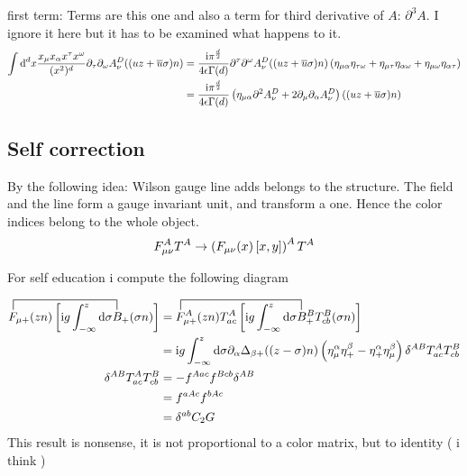first term: Terms are this one and also a term for third derivative of $A$: $\partial^3A$. I ignore it here but it has to be examined what happens to it.
\begin{align}
	\int \text{d} ^d x \frac{x_\mu x_\alpha x^\tau x^\omega}{(x^2)^{d}} \partial_\tau \partial_\omega A_\nu^D((uz+\overline u\sigma)n)
	&=
	\frac{\text{i} \pi^{\frac{d}{2}}}{4 \epsilon \Gamma(d)} \partial^\tau \partial^\omega A_\nu ^D((uz+\overline u\sigma)n)\left(\eta_{\mu \alpha} \eta_{\tau \omega} + \eta_{\mu \tau} \eta_{\alpha\omega} + \eta_{\mu \omega} \eta_{\alpha \tau}\right)
	\\
	&=
	\frac{\text{i} \pi^{\frac{d}{2}}}{4 \epsilon \Gamma(d)} \left(\eta_{\mu \alpha} \partial^2  A_\nu ^D + 2\partial_\mu \partial_\alpha A_\nu ^D \right)((uz+\overline u\sigma)n)
\end{align}

\subsection{Self correction}
By the following idea: Wilson gauge line adds belongs to the structure. The field and the line form a gauge invariant unit, and transform a one. Hence the color indices belong to the whole object.
\begin{align}
	F_{\mu \nu}^A T^A \rightarrow \left(F_{\mu \nu}(x) \left[x,y \right]\right)^{A} T^A
\end{align}

For self education i compute the following diagram

\begin{align}
	\contraction[2ex]{}{\ft}{\ft_{\mu +}(zn)\big[ \imag g  \int _{-\infty} ^{z} \dx}{B}
	\ft_{\mu +}(zn)\left[ \imag g  \int _{-\infty} ^{z} \dx \sigma B_+ (\sigma n) \right]	
	&=
	\contraction[2ex]{}{\ft}{\ft^A_{\mu +}(zn)T^A_{ac}\big[ \imag g  \int _{-\infty} ^{z} \dx}{B}
	\ft^A_{\mu +}(zn)T^A_{ac}\left[ \imag g  \int _{-\infty} ^{z} \dx \sigma B_+^BT^B_{cb} (\sigma n) \right]
	\\
	&=
	\imag g\int_{-\infty}^{z} \dx \sigma \partial_{\alpha}\propagator_{\beta+}((z-\sigma)n)\left(\metric_{\mu}^\alpha \metric^{\beta}_+ - \metric^\alpha_+ \metric^\beta_\mu \right)\delta^{AB}T^{A}_{ac} T^B_{cb}
	\\
	\delta^{AB}T^{A}_{ac} T^B_{cb}
	&=
	-f^{Aac}f^{Bcb}\delta^{AB}
	\\
	&=
	f^{aAc}f^{bAc}
	\\
	&=
	\delta^{ab}C_2{G}
\end{align}
This result is nonsense, it is not proportional to a color matrix, but to identity ( i think )

